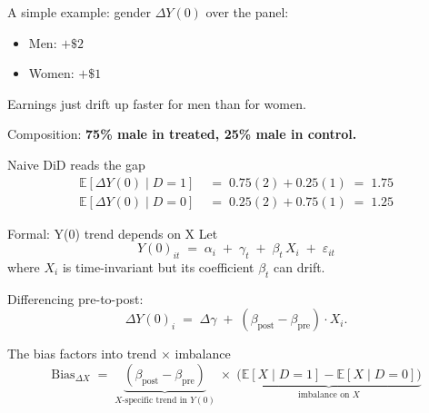 \documentclass[aspectratio=169,11pt]{beamer}
\begin{document}
\begin{frame}{A simple example: gender}
\vspace{0.4em}
$\Delta Y(0)$ \;over the panel:
\begin{itemize}\setlength\itemsep{0.4em}
  \item Men: \;$+\$2$
  \item Women: \;$+\$1$
\end{itemize}

\vspace{1em}
 \;Earnings just drift up faster for men than for women.

\vspace{1em}
Composition: \;\textbf{75\% male in treated, 25\% male in control.}
\end{frame}

\begin{frame}{Naive DiD reads the gap}
\vspace{0.6em}
\begin{align*}
\mathbb{E}[\Delta Y(0) \mid D{=}1] &\;=\; 0.75(2) + 0.25(1) \;=\; 1.75 \\[0.4em]
\mathbb{E}[\Delta Y(0) \mid D{=}0] &\;=\; 0.25(2) + 0.75(1) \;=\; 1.25
\end{align*}

\vspace{1em}
\begin{center}
\end{center}
\end{frame}

\begin{frame}{Formal: Y(0) trend depends on X}
\vspace{0.6em}
Let
\[
Y(0)_{it} \;=\; \alpha_i \;+\; \gamma_t \;+\; \beta_t \,X_i \;+\; \varepsilon_{it}
\]
where $X_i$ is time-invariant but its coefficient $\beta_t$ can drift.

\vspace{0.8em}
Differencing pre-to-post:
\[
\Delta Y(0)_i \;=\; \Delta\gamma \;+\; (\beta_{\text{post}} - \beta_{\text{pre}})\cdot X_i.
\]
\end{frame}

\begin{frame}{The bias factors into trend $\times$ imbalance}
\vspace{1em}
\[
\text{Bias}_{\Delta X} \;=\; \underbrace{(\beta_{\text{post}} - \beta_{\text{pre}})}_{\text{$X$-specific trend in $Y(0)$}} \;\times\; \underbrace{\big(\mathbb{E}[X \mid D{=}1] - \mathbb{E}[X \mid D{=}0]\big)}_{\text{imbalance on $X$}}
\]

\vspace{1.4em}
\begin{center}
\end{center}
\end{frame}
\end{document}
